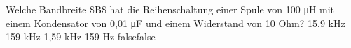     {Welche Bandbreite \$B\$ hat die Reihenschaltung einer Spule von 100 μH mit einem Kondensator von 0,01 μF und einem Widerstand von 10 Ohm?}
    {15,9 kHz}
    {159 kHz}
    {1,59 kHz}
    {159 Hz}
    {false}{false}